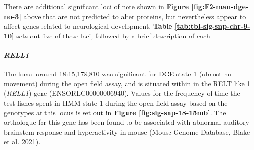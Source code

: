 \documentclass[
]{book}
\begin{document}
There are additional significant loci of note shown in \textbf{Figure \ref{fig:F2-man-dge-no-3}} above that are not predicted to alter proteins, but nevertheless appear to affect genes related to neurological development. \textbf{Table \ref{tab:tbl-sig-snp-chr-9-10}} sets out five of these loci, followed by a brief description of each.

\begin{table}

\caption{\label{tab:tbl-sig-snp-chr-9-10}Notable significant SNPs for direct genetic effects.}
\centering
{}
\end{table}

\hypertarget{rell1}{%
\paragraph{\texorpdfstring{\emph{RELL1}}{RELL1}}\label{rell1}}

The locus around 18:15,178,810 was significant for DGE state 1 (almost no movement) during the open field assay, and is situated within in the RELT like 1 (\emph{RELL1}) gene (ENSORLG00000006940). Values for the frequency of time the test fishes spent in HMM state 1 during the open field assay based on the genotypes at this locus is set out in \textbf{Figure \ref{fig:sig-snp-18-15mb}}. The orthologue for this gene has been found to be associated with abnormal auditory brainstem response and hyperactivity in mouse (Mouse Genome Database, Blake et al. 2021).
\end{document}
